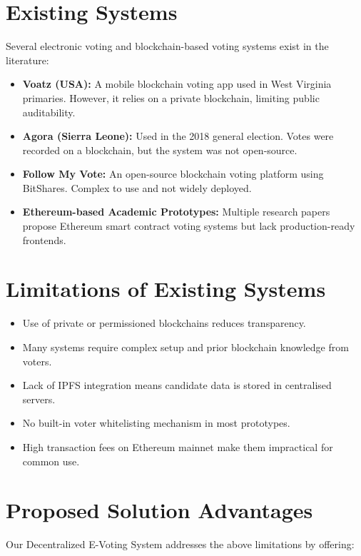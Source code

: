 \documentclass[12pt,a4paper]{report}
\begin{document}
\section{Existing Systems}

Several electronic voting and blockchain-based voting systems exist in the literature:

\begin{itemize}
\item \textbf{Voatz (USA):} A mobile blockchain voting app used in West Virginia
      primaries. However, it relies on a private blockchain, limiting public auditability.
\item \textbf{Agora (Sierra Leone):} Used in the 2018 general election. Votes were
      recorded on a blockchain, but the system was not open-source.
\item \textbf{Follow My Vote:} An open-source blockchain voting platform using
      BitShares. Complex to use and not widely deployed.
\item \textbf{Ethereum-based Academic Prototypes:} Multiple research papers propose
      Ethereum smart contract voting systems but lack production-ready frontends.
\end{itemize}

\section{Limitations of Existing Systems}

\begin{itemize}
\item Use of private or permissioned blockchains reduces transparency.
\item Many systems require complex setup and prior blockchain knowledge from voters.
\item Lack of IPFS integration means candidate data is stored in centralised servers.
\item No built-in voter whitelisting mechanism in most prototypes.
\item High transaction fees on Ethereum mainnet make them impractical for common use.
\end{itemize}

\section{Proposed Solution Advantages}

Our Decentralized E-Voting System addresses the above limitations by offering:
\end{document}
